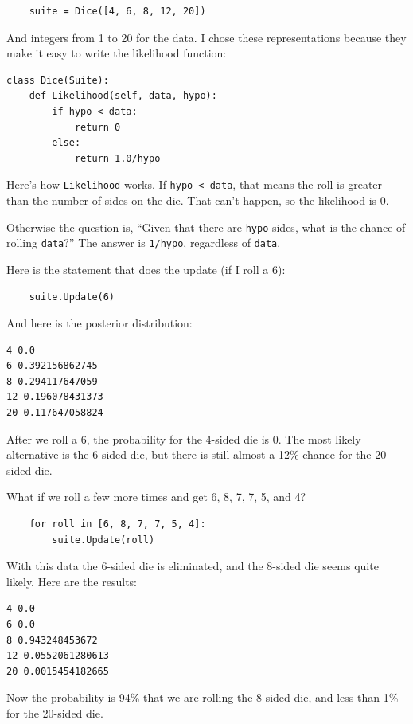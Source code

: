 \documentclass[12pt]{book}
\begin{document}
\begin{verbatim}
    suite = Dice([4, 6, 8, 12, 20])
\end{verbatim}

And integers from 1 to 20 for the data.
I chose these representations because they make it easy to
write the likelihood function:

\begin{verbatim}
class Dice(Suite):
    def Likelihood(self, data, hypo):
        if hypo < data:
            return 0
        else:
            return 1.0/hypo
\end{verbatim}

Here's how \verb"Likelihood" works.  If \verb"hypo < data", that
means the roll is greater than the number of sides on the die.
That can't happen, so the likelihood is 0.

Otherwise the question is, ``Given that there are {\tt hypo}
sides, what is the chance of rolling {\tt data}?''  The
answer is \verb"1/hypo", regardless of {\tt data}.

Here is the statement that does the update (if I roll a 6):

\begin{verbatim}
    suite.Update(6)
\end{verbatim}

And here is the posterior distribution:

\begin{verbatim}
4 0.0
6 0.392156862745
8 0.294117647059
12 0.196078431373
20 0.117647058824
\end{verbatim}

After we roll a 6, the probability for the 4-sided die is 0.  The
most likely alternative is the 6-sided die, but there is still
almost a 12\% chance for the 20-sided die.

What if we roll a few more times and get 6, 8, 7, 7, 5, and 4?

\begin{verbatim}
    for roll in [6, 8, 7, 7, 5, 4]:
        suite.Update(roll)
\end{verbatim}

With this data the 6-sided die is eliminated, and the 8-sided
die seems quite likely.  Here are the results:

\begin{verbatim}
4 0.0
6 0.0
8 0.943248453672
12 0.0552061280613
20 0.0015454182665
\end{verbatim}

Now the probability is 94\% that we are rolling the 8-sided die,
and less than 1\% for the 20-sided die.
\end{document}
